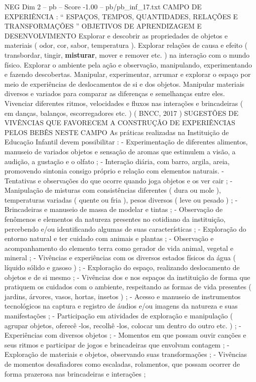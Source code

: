 \begin{textsample}{NEG Dim 2 – pb – Score -1.00 – pb/pb\_inf\_17.txt}  \label{ex:f2_neg_016}
CAMPO DE EXPERIÊNCIA : “ ESPAÇOS, TEMPOS, QUANTIDADES, RELAÇÕES E TRANSFORMAÇÕES ” OBJETIVOS DE APRENDIZAGEM E DESENVOLVIMENTO Explorar e descobrir as propriedades de objetos e materiais ( odor, cor, sabor, temperatura ).
Explorar relações de causa e efeito ( transbordar, tingir, \textbf{misturar}, mover e remover etc. ) na interação com o mundo físico.
Explorar o ambiente pela ação e observação, manipulando, experimentando e fazendo descobertas.
Manipular, experimentar, arrumar e explorar o espaço por meio de experiências de deslocamentos de si e dos objetos.
Manipular materiais diversos e variados para comparar as diferenças e semelhanças entre eles.
Vivenciar diferentes ritmos, velocidades e fluxos nas interações e brincadeiras ( em danças, balanços, escorregadores etc. ) ( BNCC, 2017 ) SUGESTÕES DE VIVÊNCIAS QUE FAVORECEM A CONSTRUÇÃO DE EXPERIÊNCIAS PELOS BEBÊS NESTE CAMPO As práticas realizadas na Instituição de Educação Infantil devem possibilitar : - Experimentação de diferentes alimentos, manuseio de variados objetos e sensação de aromas que estimulem a visão, a audição, a gustação e o olfato ; - Interação diária, com barro, argila, areia, promovendo sintonia consigo próprio e relação com elementos naturais. - Tentativas e observações do que ocorre quando joga objetos e os ver cair ; - Manipulação de misturas com consistências diferentes ( dura ou mole ), temperaturas variadas ( quente ou fria ), pesos diversos ( leve ou pesado ) ; - Brincadeiras e manuseio de massa de modelar e tintas ; - Observação de fenômenos e elementos da natureza presentes no cotidiano da instituição, percebendo e/ou identificando algumas de suas características ; - Exploração do entorno natural e ter cuidado com animais e plantas ; - Observação e acompanhamento do elemento terra como gerador de vida animal, vegetal e mineral ; - Vivências e experiências com os diversos estados físicos da água ( líquido sólido e gasoso ) ; - Exploração do espaço, realizando deslocamento de objetos e de si mesmo ; - Vivências dos e nos espaços da instituição de forma que pratiquem os cuidados com o ambiente, respeitando as formas de vida presentes ( jardins, árvores, vasos, hortas, insetos ) ; - Acesso e manuseio de instrumentos tecnológicos na captura e registro de áudios e/ou imagens da natureza e suas manifestações ; - Participação em atividades de exploração e manipulação ( agrupar objetos, oferecê -los, recolhê -los, colocar um dentro do outro etc. ) ; - Experiências com diversos objetos ; - Momentos em que possam ouvir canções e seus ritmos e participar de jogos e brincadeiras que envolvam contagem ; - Exploração de materiais e objetos, observando suas transformações ; - Vivências de momentos desafiadores como escaladas, rolamentos, que possam ocorrer de forma prazerosa nas brincadeiras e interações ;

\end{textsample}
